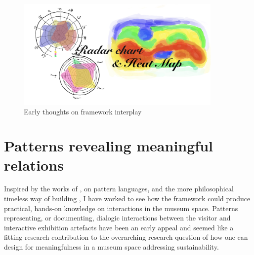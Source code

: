 \begin{figure}[H]
\centering 
\includegraphics[width=10cm]{pictures/Theory/radar_and_heatmap.jpeg}
\caption{Early thoughts on framework interplay}
\end{figure}

\section{Patterns revealing meaningful relations}
Inspired by the works of \autocite{pattern_language_1977}, on pattern languages, and the more philosophical timeless way of building \autocite{Alexander_book}, I have worked to see how the framework could produce practical, hands-on knowledge on interactions in the museum space. Patterns representing, or documenting, dialogic interactions between the visitor and interactive exhibition artefacts have been an early appeal and seemed like a fitting research contribution to the overarching research question of how one can design for meaningfulness in a museum space addressing sustainability.

